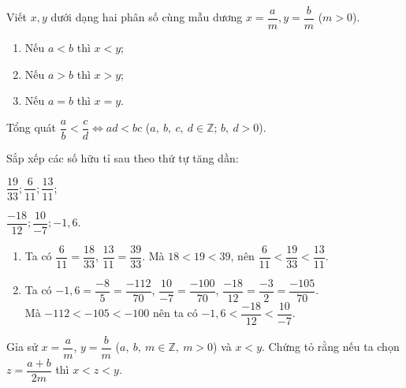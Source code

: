 \begin{dang}
Viết $x, y$ dưới dạng hai phân số cùng mẫu dương $x=\dfrac{a}{m}, y=\dfrac{b}{m}$ ($m>0$).
\begin{enumerate}[\tickEX]
	\item Nếu $a<b$ thì $x<y$;
	\item Nếu $a>b$ thì $x>y$;
	\item Nếu $a=b$ thì $x=y$.
\end{enumerate}
Tổng quát $\dfrac{a}{b}<\dfrac{c}{d}\Leftrightarrow ad<bc$ ($a,\ b,\ c,\ d \in\mathbb{Z}$; $b,\ d>0$).
\end{dang}
\begin{vd}
	Sắp xếp các số hữu tỉ sau theo thứ tự tăng dần:
	\begin{listEX}[2]
		\item $\dfrac{19}{33}; \dfrac{6}{11}; \dfrac{13}{11}$;
		\item $\dfrac{-18}{12}; \dfrac{10}{-7}; -1,6$.
	\end{listEX}
	\loigiai
	{
\begin{enumerate}
			\item Ta có 
				$\dfrac{6}{11}=\dfrac{18}{33}$, $\dfrac{13}{11}=\dfrac{39}{33}$. Mà $18<19<39$, nên $\dfrac{6}{11}<\dfrac{19}{33}<\dfrac{13}{11}$.
			\item  Ta có $-1,6=\dfrac{-8}{5}=\dfrac{-112}{70}$, $\dfrac{10}{-7}=\dfrac{-100}{70}$, $\dfrac{-18}{12}=\dfrac{-3}{2}=\dfrac{-105}{70}$. \\
				Mà $-112<-105<-100$ nên ta có $-1,6<\dfrac{-18}{12}<\dfrac{10}{-7}$.

\end{enumerate}

	}
\end{vd}
\begin{vd}
Gỉa sử $x=\dfrac{a}{m}$, $y=\dfrac{b}{m}$ ($a,\ b,\ m \in \mathbb{Z},\ m>0$) và $x<y$. Chứng tỏ rằng nếu ta chọn $z=\dfrac{a+b}{2m}$ thì $x<z<y.$
\end{vd}

